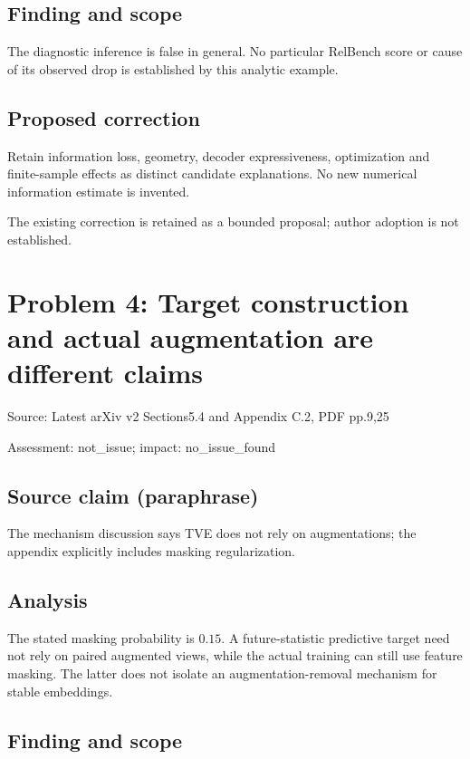 \documentclass[11pt]{article}
\begin{document}
\subsection*{Finding and scope}

The diagnostic inference is false in general. No particular RelBench score or cause of its observed drop is established by this analytic example.

\subsection*{Proposed correction}

Retain information loss, geometry, decoder expressiveness, optimization and finite-sample effects as distinct candidate explanations. No new numerical information estimate is invented.

The existing correction is retained as a bounded proposal; author adoption is not established.

\section*{Problem 4: Target construction and actual augmentation are different claims}

Source: Latest arXiv v2 Sections5.4 and Appendix C.2, PDF pp.9,25

Assessment: not\_issue; impact: no\_issue\_found

\subsection*{Source claim (paraphrase)}

The mechanism discussion says TVE does not rely on augmentations; the appendix explicitly includes masking regularization.

\subsection*{Analysis}

The stated masking probability is \(0.15\). A future-statistic predictive target need not rely on paired augmented views, while the actual training can still use feature masking. The latter does not isolate an augmentation-removal mechanism for stable embeddings.

\subsection*{Finding and scope}
\end{document}
